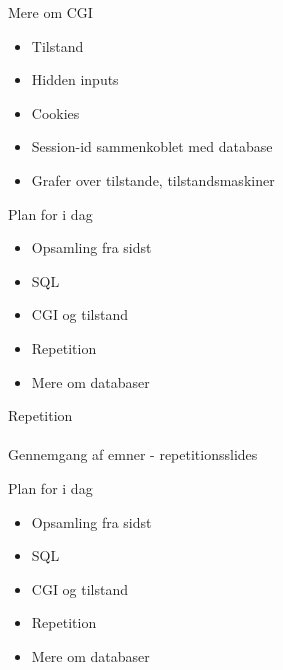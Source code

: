 \documentclass[a4paper,landscape]{slides}
\begin{document}
\begin{slide}
	\begin{center} {\large 
        Mere om CGI
	} \end{center}
	\begin{itemize} \addtolength{\itemsep}{-\baselineskip}
           \item Tilstand
           \item Hidden inputs
           \item Cookies
           \item Session-id sammenkoblet med database
           \item Grafer over tilstande, tilstandsmaskiner
	\end{itemize}
\end{slide}

\begin{slide}
	\begin{center} {\large 
            Plan for i dag
	} \end{center}
	\begin{itemize} \addtolength{\itemsep}{-\baselineskip}
		\item Opsamling fra sidst
		\item SQL
		\item CGI og tilstand
		\item Repetition
		\item Mere om databaser
	\end{itemize}
\end{slide}

\begin{slide}
	\begin{center} {\large 
        Repetition
        \\
        ~ \\
    Gennemgang af emner - repetitionsslides
	} \end{center}
\end{slide}

\begin{slide}
	\begin{center} {\large 
            Plan for i dag
	} \end{center}
	\begin{itemize} \addtolength{\itemsep}{-\baselineskip}
		\item Opsamling fra sidst
		\item SQL
		\item CGI og tilstand
		\item Repetition
		\item Mere om databaser
	\end{itemize}
\end{slide}
\end{document}
